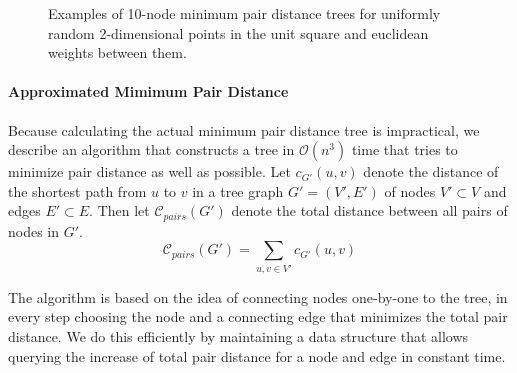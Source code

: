 \documentclass[a4paper, oneside]{discothesis}
\begin{document}
\begin{figure}[]
\begin{subfigure}[t]{0.5\textwidth}
\end{subfigure}
\caption{Examples of 10-node minimum pair distance trees for uniformly random 2-dimensional points in the unit square and euclidean weights between them.}
\label{fig:minPairDist}
\end{figure}

\paragraph{Approximated Mimimum Pair Distance}

Because calculating the actual minimum pair distance tree is impractical, we describe an algorithm that constructs a tree in $\mathcal{O}(n^3)$ time that tries to minimize pair distance as well as possible. Let $c_{G'}(u, v)$ denote the distance of the shortest path from $u$ to $v$ in a tree graph $G'=(V',E')$ of nodes $V'\subset V$ and edges $E'\subset E$. Then let $\mathcal{C}_{pairs}(G')$ denote the total distance between all pairs of nodes in $G'$.
\begin{equation}
\mathcal{C}_{pairs}(G') = \sum_{u,v\in V'}c_{G'}(u,v)
\end{equation}

The algorithm is based on the idea of connecting nodes one-by-one to the tree, in every step choosing the node and a connecting edge that minimizes the total pair distance. We do this efficiently by maintaining a data structure that allows querying the increase of total pair distance for a node and edge in constant time.
\end{document}
